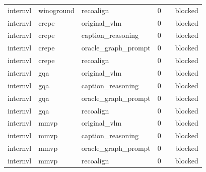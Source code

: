 \begin{table}[t]
\begin{tabular}{llllll}
internvl & winoground & recoalign & 0 &  & blocked \\
internvl & crepe & original\_vlm & 0 &  & blocked \\
internvl & crepe & caption\_reasoning & 0 &  & blocked \\
internvl & crepe & oracle\_graph\_prompt & 0 &  & blocked \\
internvl & crepe & recoalign & 0 &  & blocked \\
internvl & gqa & original\_vlm & 0 &  & blocked \\
internvl & gqa & caption\_reasoning & 0 &  & blocked \\
internvl & gqa & oracle\_graph\_prompt & 0 &  & blocked \\
internvl & gqa & recoalign & 0 &  & blocked \\
internvl & mmvp & original\_vlm & 0 &  & blocked \\
internvl & mmvp & caption\_reasoning & 0 &  & blocked \\
internvl & mmvp & oracle\_graph\_prompt & 0 &  & blocked \\
internvl & mmvp & recoalign & 0 &  & blocked \\
\bottomrule
\end{tabular}
\end{table}
